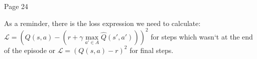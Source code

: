 Page 24

As a reminder, there is the loss expression we need to calculate: \begin{math}\mathcal{L} = (Q(s, a) -
(r + \gamma \max\limits_{a' \in A} \hat{Q}(s',a')))^2\end{math} for steps which wasn`t
  at the end of the episode or
  \begin{math}\mathcal{L} = (Q(s, a) - r)^2\end{math} for final steps.

